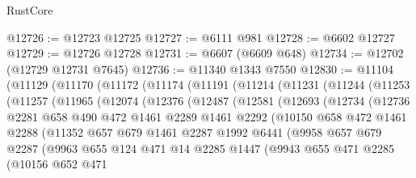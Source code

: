 \begin{lexlean}{RustCore}
\begin{coremodule}
@12726 := @12723 @12725
@12727 := @6111 @981
@12728 := @6602 @12727
@12729 := @12726 @12728
@12731 := @6607 (@6609 @648)
@12734 := @12702 (@12729 @12731 @7645)
@12736 := @11340 @1343 @7550
@12830 := @11104
    (@11129
      (@11170
        (@11172
          (@11174
            (@11191
              (@11214
                (@11231
                  (@11244
                    (@11253
                      (@11257
                        (@11965
                          (@12074
                            (@12376
                              (@12487
                                (@12581
                                  (@12693
                                    (@12734
                                      (@12736
                                        @2281
                                        @658
                                        @490
                                        @472
                                        @1461
                                        @2289
                                        @1461
                                        @2292
                                        (@10150
                                          @658
                                          @472
                                          @1461
                                          @2288
                                          (@11352
                                            @657
                                            @679
                                            @1461
                                            @2287
                                            @1992
                                            @6441
                                            (@9958
                                              @657
                                              @679
                                              @2287
                                              (@9963
                                                @655
                                                @124
                                                @471
                                                @14
                                                @2285
                                                @1447
                                                (@9943
                                                  @655
                                                  @471
                                                  @2285
                                                  (@10156
                                                    @652
                                                    @471

\end{coremodule}
\end{lexlean}
